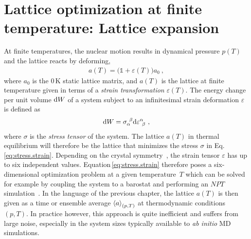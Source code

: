 \section{Lattice optimization at finite temperature: Lattice expansion}
\label{sec:app.lattice_expansion}
At finite temperatures,
the nuclear motion results in dynamical pressure $p(T)$ and the lattice reacts by deforming,
\begin{align}
a (T) = \bm ( \mathds 1 + \varepsilon (T) \bm ) a_0~,
\label{eq:lattice.T}
\end{align}
where $a_0$ is the 0\,K static lattice matrix, and $a (T)$ is the lattice at finite temperature given in terms of a \emph{strain transformation} $\varepsilon (T)$. 
The energy change per unit volume ${\rm d} W$ of a system subject to an infinitesimal strain deformation $\varepsilon$ is defined as
\begin{align}
\d W = \sigma_{\alpha}^{~\beta} \d \varepsilon^{\alpha}_{~\beta}~,
\label{eq:stress.strain}
\end{align}
where $\sigma$ is the \emph{stress tensor} of the system. The lattice $a(T)$ in thermal equilibrium will therefore be the lattice that minimizes the stress $\sigma$ in Eq.\,\eqref{eq:stress.strain}. Depending on the crystal symmetry~\cite{Nye1985}, the strain tensor $\varepsilon$ has up to six independent values. Equation\,\eqref{eq:stress.strain} therefore poses a six-dimensional optimization problem at a given temperature~$T$ which can be solved for example by coupling the system to a barostat and performing an $NPT$ simulation~\cite{FrenkelSmit}. In the language of the previous chapter, the lattice $a(T)$ is then given as a time or ensemble average $\braket{a}_{(p, T)}$ at thermodynamic conditions $(p, T)$. In practice however, this approach is quite inefficient and suffers from large noise, especially in the system sizes typically available to \emph{ab initio} MD simulations.

